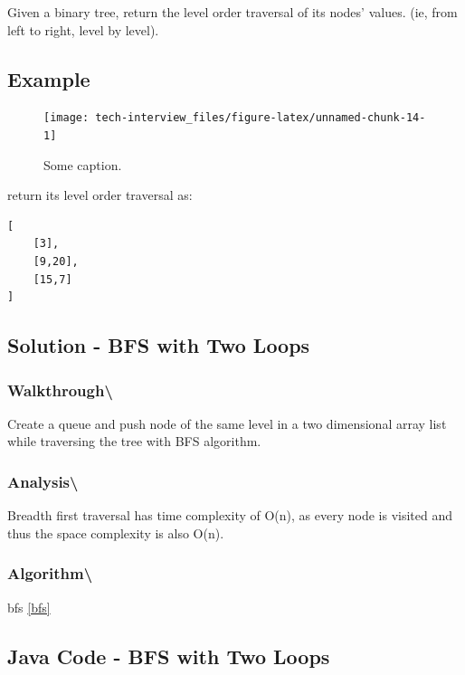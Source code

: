 \documentclass[]{book}
\begin{document}
Given a binary tree, return the level order traversal of its nodes' values. (ie, from left to right, level by
level).

\hypertarget{example-52}{%
\subsection{Example}\label{example-52}}

\begin{figure}
\texttt{[image: tech-interview\_files/figure-latex/unnamed-chunk-14-1]} \caption{Some caption.}\label{fig:unnamed-chunk-14}
\end{figure}

return its level order traversal as:

\begin{verbatim}
[
    [3],
    [9,20],
    [15,7]
]
\end{verbatim}

\hypertarget{solution---bfs-with-two-loops}{%
\subsection{Solution - BFS with Two Loops}\label{solution---bfs-with-two-loops}}

\hypertarget{walkthrough-54}{%
\subsubsection{Walkthrough\textbackslash{}}\label{walkthrough-54}}

Create a queue and push node of the same level in a two dimensional array list while traversing the tree with
BFS algorithm.

\hypertarget{analysis-61}{%
\subsubsection{Analysis\textbackslash{}}\label{analysis-61}}

Breadth first traversal has time complexity of O(n), as every node is visited and thus the space
complexity is also O(n).

\hypertarget{algorithm-63}{%
\subsubsection{Algorithm\textbackslash{}}\label{algorithm-63}}

bfs \ref{bfs}

\hypertarget{java-code---bfs-with-two-loops}{%
\subsection{Java Code - BFS with Two Loops}\label{java-code---bfs-with-two-loops}}
\end{document}
